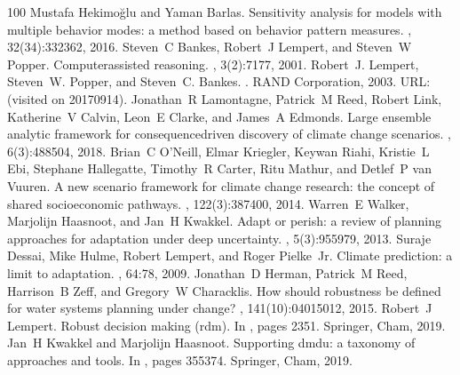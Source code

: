 \documentclass[letterpaper,10pt,english]{sphinxmanual}
\begin{document}
\begin{sphinxthebibliography}{100}
\sphinxAtStartPar
Mustafa Hekimoğlu and Yaman Barlas. Sensitivity analysis for models with multiple behavior modes: a method based on behavior pattern measures. , 32(3\sphinxhyphen{}4):332\textendash{}362, 2016.
\sphinxAtStartPar
Steven C Bankes, Robert J Lempert, and Steven W Popper. Computer\sphinxhyphen{}assisted reasoning. , 3(2):71\textendash{}77, 2001.
\sphinxAtStartPar
Robert J. Lempert, Steven W. Popper, and Steven C. Bankes. . RAND Corporation, 2003. URL:  (visited on 2017\sphinxhyphen{}09\sphinxhyphen{}14).
\sphinxAtStartPar
Jonathan R Lamontagne, Patrick M Reed, Robert Link, Katherine V Calvin, Leon E Clarke, and James A Edmonds. Large ensemble analytic framework for consequence\sphinxhyphen{}driven discovery of climate change scenarios. , 6(3):488\textendash{}504, 2018.
\sphinxAtStartPar
Brian C O’Neill, Elmar Kriegler, Keywan Riahi, Kristie L Ebi, Stephane Hallegatte, Timothy R Carter, Ritu Mathur, and Detlef P van Vuuren. A new scenario framework for climate change research: the concept of shared socioeconomic pathways. , 122(3):387\textendash{}400, 2014.
\sphinxAtStartPar
Warren E Walker, Marjolijn Haasnoot, and Jan H Kwakkel. Adapt or perish: a review of planning approaches for adaptation under deep uncertainty. , 5(3):955\textendash{}979, 2013.
\sphinxAtStartPar
Suraje Dessai, Mike Hulme, Robert Lempert, and Roger Pielke Jr. Climate prediction: a limit to adaptation. , 64:78, 2009.
\sphinxAtStartPar
Jonathan D Herman, Patrick M Reed, Harrison B Zeff, and Gregory W Characklis. How should robustness be defined for water systems planning under change? , 141(10):04015012, 2015.
\sphinxAtStartPar
Robert J Lempert. Robust decision making (rdm). In , pages 23\textendash{}51. Springer, Cham, 2019.
\sphinxAtStartPar
Jan H Kwakkel and Marjolijn Haasnoot. Supporting dmdu: a taxonomy of approaches and tools. In , pages 355\textendash{}374. Springer, Cham, 2019.

\end{sphinxthebibliography}
\end{document}
